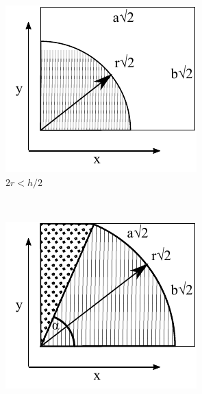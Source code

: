 \documentclass[superscriptaddress,pre,reprint,showpacs,twocolumn]{revtex4-1}
\begin{document}
\begin{figure}[h]
        \centering
        \begin{subfigure}[b]{0.32\textwidth}
          \centering
          \includegraphics[width=\textwidth]{figures/DiagramaIntegraCaso1.pdf}
          \caption{$2r<h/2$}
          \label{Caso1}
        \end{subfigure}%
        ~ %
        \begin{subfigure}[b]{0.32\textwidth}
          \centering
          \includegraphics[width=\textwidth]{figures/DiagramaIntegraCaso2.pdf}

\end{subfigure}
\end{figure}
\end{document}
